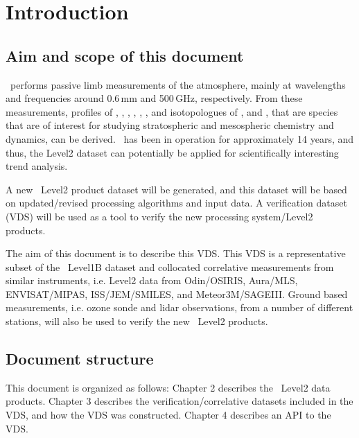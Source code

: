 \chapter{Introduction}
\label{chapter:introduction}


\setcounter{page}{1}


\section{Aim and scope of this document}
\label{sec:aim}
\smr\ performs passive limb measurements of the atmosphere,
mainly at wavelengths and frequencies around 0.6\,mm and 500\,GHz,
respectively.
From these measurements, profiles of 
, , , , 
, , and isotopologues of , and ,
that are species that are of interest for studying stratospheric and 
mesospheric chemistry and dynamics, can be derived. 
\smr\ has been in operation for approximately 14 years, and thus, the Level2
dataset can potentially be applied for scientifically interesting trend analysis.

A new \smr\ Level2 product dataset will be generated, and this dataset will be based
on updated/revised processing algorithms and input data.
A verification dataset (VDS) will be used as a tool to verify the new 
processing system/Level2 products.

The aim of this document is to describe this VDS.
This VDS is a representative subset of the \smr\ Level1B dataset
and collocated correlative measurements from similar
instruments, i.e. Level2 data from Odin/OSIRIS, Aura/MLS, ENVISAT/MIPAS,
ISS/JEM/SMILES, and Meteor3M/SAGEIII.   
Ground based measurements, i.e. ozone sonde and lidar observations,
from a number of different stations, will also be used
to verify the new \smr\ Level2 products.  

\section{Document structure}

This document is organized as follows:
Chapter 2 describes the \smr\ Level2 data products.
Chapter 3 describes the verification/correlative datasets
included in the VDS, and how the VDS was constructed.
Chapter 4 describes an API to the VDS.


